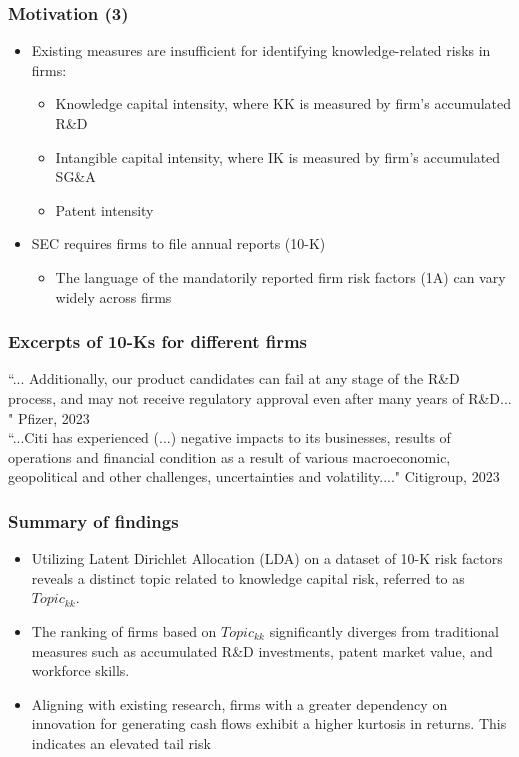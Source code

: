 \documentclass{beamer}
\begin{document}
\begin{frame}
\frametitle{Motivation (3)}
  \begin{itemize}
  \item Existing measures are insufficient for identifying  knowledge-related risks in firms:
\begin{itemize}
\item Knowledge capital intensity, where KK is measured by firm's accumulated R\&D
\item Intangible capital intensity, where IK is measured by firm's accumulated SG\&A
\item Patent intensity 
\end{itemize}
\item SEC requires firms to file annual reports (10-K)
\begin{itemize}
\item The language of the mandatorily reported firm risk factors (1A) can vary widely across firms 
\end{itemize}
\end{itemize}
\end{frame}

\begin{frame}
\frametitle{Excerpts of 10-Ks for different firms}

``... Additionally, our product candidates can fail at any stage of the R\&D process, and may not receive regulatory approval even after many years of R\&D... " Pfizer, 2023\\
	
\vspace{2\baselineskip}
	``...Citi has experienced (...) negative impacts to its businesses, results of operations and financial condition as a result of various macroeconomic, geopolitical and other challenges, uncertainties and volatility...." Citigroup, 2023
\end{frame}

\begin{frame}
\frametitle{Summary of findings}
\begin{itemize}
	\item Utilizing Latent Dirichlet Allocation (LDA) on a dataset of 10-K risk factors reveals a distinct topic related to knowledge capital risk, referred to as $Topic_{kk}$. %
	\item The ranking of firms based on $Topic_{kk}$ significantly diverges from traditional measures such as accumulated R\&D investments, patent market value, and workforce skills.
	\item  Aligning with existing research, firms with a greater dependency on innovation for generating cash flows exhibit a higher kurtosis in returns. This indicates an elevated tail risk
\end{itemize}
\end{frame}
\end{document}

